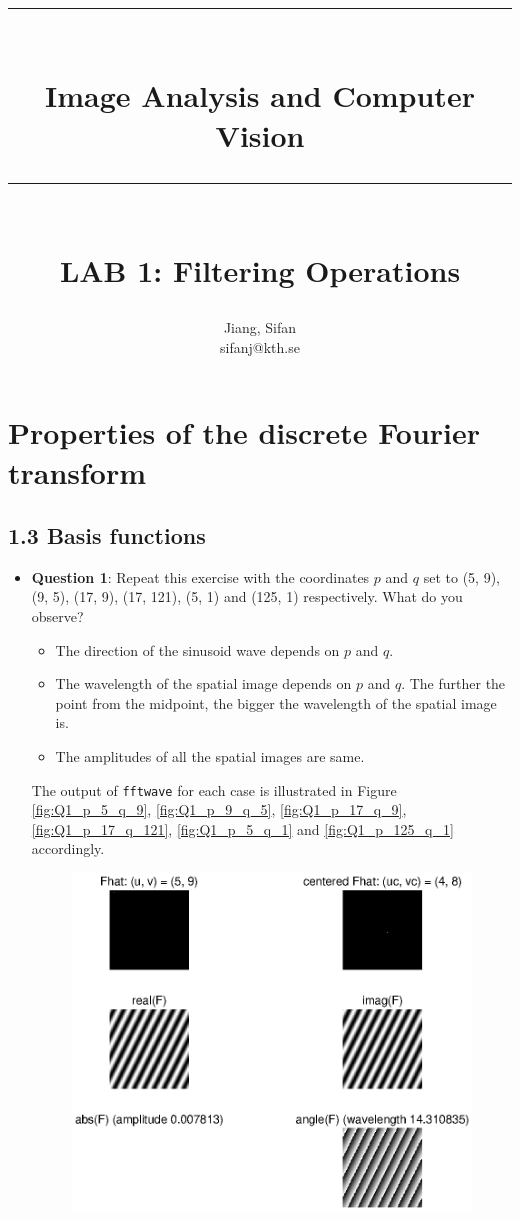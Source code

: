\documentclass[11pt,a4paper]{article}
\title{\vspace{3cm}\large{\hrule\vspace{0.3cm}\sc{\LARGE DD2423}\\\vspace{0.1cm}Image Analysis and Computer Vision\vspace{0.3cm}\hrule\vspace{1.5cm}{\Large Laboratory Report}\\\vspace{0.3cm}LAB 1: Filtering Operations}}
\author{Jiang, Sifan\\sifanj@kth.se}
\begin{document}
\maketitle
\newpage
\section{Properties of the discrete Fourier transform}
\subsection*{1.3 Basis functions}
\begin{itemize}
	\item \textbf{Question 1}: Repeat this exercise with the coordinates $p$ and $q$ set to (5, 9), (9, 5), (17, 9), (17, 121), (5, 1) and (125, 1) respectively. What do you observe?
	\begin{itemize}
		\item The direction of the sinusoid wave depends on $p$ and $q$.
		\item The wavelength of the spatial image depends on $p$ and $q$. The further the point from the midpoint, the bigger the wavelength of the spatial image is.
		\item The amplitudes of all the spatial images are same.
	\end{itemize}
	\par The output of \texttt{fftwave} for each case is illustrated in Figure \ref{fig:Q1_p_5_q_9}, \ref{fig:Q1_p_9_q_5}, \ref{fig:Q1_p_17_q_9}, \ref{fig:Q1_p_17_q_121}, \ref{fig:Q1_p_5_q_1} and \ref{fig:Q1_p_125_q_1} accordingly.
	\begin{figure}[!ht]
		\footnotesize
		\centering
		\includegraphics[width=0.9\columnwidth]{Q1_p_5_q_9.eps}

\end{figure}
\end{itemize}
\end{document}
